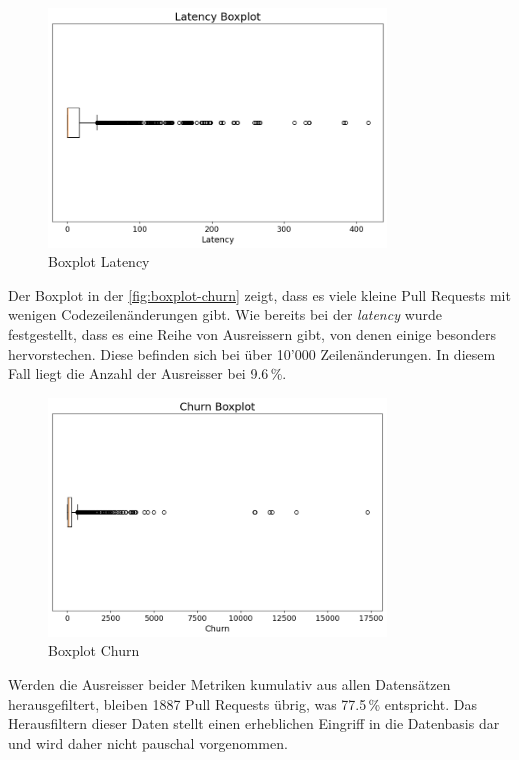 \begin{figure}[htbp]
    \includegraphics[width=0.8\textwidth]{Figures/boxplot-latency.png}
    \centering
    \caption{Boxplot Latency}
    \label{fig:boxplot-latency}
\end{figure}

Der Boxplot in der \autoref{fig:boxplot-churn} zeigt, dass es viele kleine Pull Requests mit wenigen Codezeilenänderungen gibt. Wie bereits bei der \textit{latency} wurde festgestellt, dass es eine Reihe von Ausreissern gibt, von denen einige besonders hervorstechen. Diese befinden sich bei über 10'000 Zeilenänderungen. In diesem Fall liegt die Anzahl der Ausreisser bei 9.6\,\%.

\begin{figure}[htbp]
    \includegraphics[width=0.8\textwidth]{Figures/boxplot-churn.png}
      \centering
    \caption{Boxplot Churn}
    \label{fig:boxplot-churn}
\end{figure}

Werden die Ausreisser beider Metriken kumulativ aus allen Datensätzen herausgefiltert, bleiben 1887 Pull Requests übrig, was 77.5\,\% entspricht. Das Herausfiltern dieser Daten stellt einen erheblichen Eingriff in die Datenbasis dar und wird daher nicht pauschal vorgenommen.

